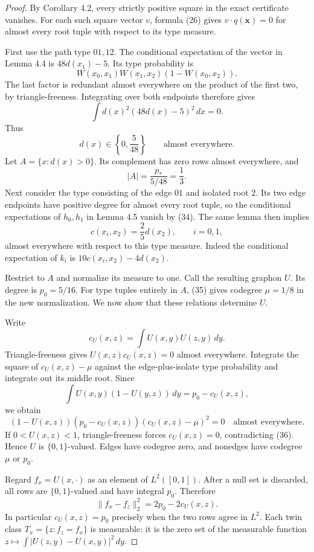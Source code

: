 \documentclass[11pt]{amsart}
\theoremstyle{definition}
\theoremstyle{remark}
\begin{document}
\begin{proof}
By Corollary 4.2, every strictly positive square in the exact certificate
vanishes. For each such square vector $v$, formula (26) gives
$v\cdot q(\mathbf x)=0$ for almost every root tuple with respect to its
type measure.

First use the path type $01,12$. The conditional expectation of the vector
in Lemma 4.4 is $48d(x_1)-5$. Its type probability is
\[
 W(x_0,x_1)W(x_1,x_2)(1-W(x_0,x_2)).
\]
The last factor is redundant almost everywhere on the product of the first
two, by triangle-freeness. Integrating over both endpoints therefore gives
\[
 \int d(x)^2(48d(x)-5)^2\,dx=0.
\]
Thus
\begin{equation}\tag{34}\label{eq:34}
 d(x)\in\left\{0,\frac5{48}\right\}\qquad\text{almost everywhere}.
\end{equation}
Let $A=\{x:d(x)>0\}$. Its complement has zero rows almost everywhere, and
\[
 |A|=\frac{p_\ast}{5/48}=\frac13.
\]
Next consider the type consisting of the edge $01$ and isolated root $2$.
Its two edge endpoints have positive degree for almost every root tuple,
so the conditional expectations of $h_0,h_1$ in Lemma 4.5 vanish by (34).
The same lemma then implies
\begin{equation}\tag{35}\label{eq:35}
 c(x_i,x_2)=\frac25d(x_2),\qquad i=0,1,
\end{equation}
almost everywhere with respect to this type measure. Indeed the conditional
expectation of $k_i$ is $10c(x_i,x_2)-4d(x_2)$.

Restrict to $A$ and normalize its measure to one. Call the resulting
graphon $U$. Its degree is $p_0=5/16$. For type tuples entirely in $A$,
(35) gives codegree $\mu=1/8$ in the new normalization. We now show that
these relations determine $U$.

Write
\[
 c_U(x,z)=\int U(x,y)U(z,y)\,dy.
\]
Triangle-freeness gives $U(x,z)c_U(x,z)=0$ almost everywhere. Integrate
the square of $c_U(x,z)-\mu$ against the edge-plus-isolate type probability
and integrate out its middle root. Since
\[
 \int U(x,y)(1-U(y,z))\,dy=p_0-c_U(x,z),
\]
we obtain
\begin{equation}\tag{36}\label{eq:36}
 (1-U(x,z))(p_0-c_U(x,z))(c_U(x,z)-\mu)^2=0
 \quad\text{almost everywhere}.
\end{equation}
If $0<U(x,z)<1$, triangle-freeness forces $c_U(x,z)=0$, contradicting
(36). Hence $U$ is $\{0,1\}$-valued. Edges have codegree zero, and
nonedges have codegree $\mu$ or $p_0$.

Regard $f_x=U(x,\cdot)$ as an element of $L^2([0,1])$. After a null set
is discarded, all rows are $\{0,1\}$-valued and have integral $p_0$.
Therefore
\[
 \|f_x-f_z\|_2^2=2p_0-2c_U(x,z).
\]
In particular $c_U(x,z)=p_0$ precisely when the two rows agree in $L^2$.
Each twin class $T_x=\{z:f_z=f_x\}$ is measurable: it is the zero set of
the measurable function $z\mapsto\int|U(z,y)-U(x,y)|^2\,dy$.


\end{proof}
\end{document}

